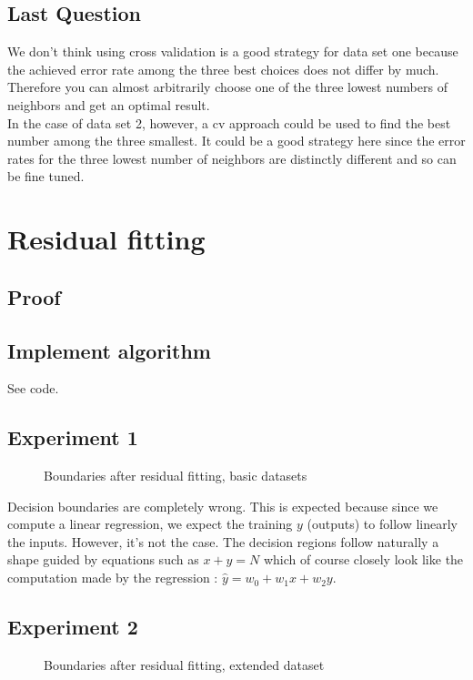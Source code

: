\documentclass{article}
\begin{document}
\subsection{Last Question}
We don't think using cross validation is a good strategy for data set one because the achieved error rate among the three best choices does not differ by much. Therefore you can almost arbitrarily choose one of the three lowest numbers of neighbors and get an optimal result. \\
In the case of data set 2, however, a cv approach could be used to find the best number among the three smallest. It could be a good strategy here since the error rates for the three lowest number of neighbors are distinctly different and so can be fine tuned. 

\section{Residual fitting}
\subsection{Proof}
\subsection{Implement algorithm}
See code.
\subsection{Experiment 1}
	\begin{figure}[H]
	\centering
	
	\caption{\label{resfit1}Boundaries after residual fitting, basic datasets}
     \end{figure}

Decision boundaries are completely wrong.
This is expected because since we compute a linear regression, we expect
the training $y$ (outputs) to follow linearly the inputs. However, it's not the case. The decision  regions follow naturally a shape guided by equations such as $x + y = N$ which of course closely look like the computation made by the regression :  $\hat{y} = w_0 + w_1 x + w_2 y$.

\subsection{Experiment 2}
	\begin{figure}[H]
	\centering
	
	\caption{\label{resfit1}Boundaries after residual fitting, extended dataset}
     \end{figure}
\end{document}
